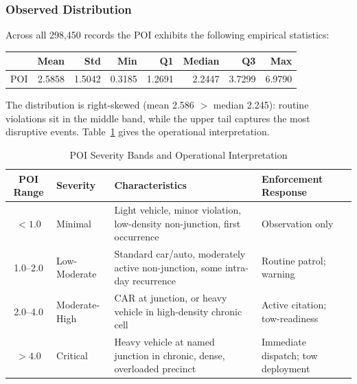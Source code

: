 \documentclass[12pt,a4paper]{article}
\begin{document}
\subsubsection*{Observed Distribution}

Across all 298,450 records the POI exhibits the following empirical statistics:

\begin{center}
\small
\begin{tabular}{@{}lrrrrrrr@{}}
\toprule
 & \textbf{Mean} & \textbf{Std} & \textbf{Min} & \textbf{Q1} & \textbf{Median} & \textbf{Q3} & \textbf{Max}\\
\midrule
POI & 2.5858 & 1.5042 & 0.3185 & 1.2691 & 2.2447 & 3.7299 & 6.9790\\
\bottomrule
\end{tabular}
\end{center}

The distribution is right-skewed (mean 2.586 $>$ median 2.245): routine violations sit in the middle band, while the upper tail captures the most disruptive events. Table~\ref{tab:poi_bands} gives the operational interpretation.

\begin{table}[htbp]
\centering
\caption{POI Severity Bands and Operational Interpretation}
\label{tab:poi_bands}
\small
\begin{tabularx}{\textwidth}{@{}clp{5.2cm}X@{}}
\toprule
\textbf{POI Range} & \textbf{Severity} & \textbf{Characteristics} & \textbf{Enforcement Response}\\
\midrule
$<1.0$   & Minimal       & Light vehicle, minor violation, low-density non-junction, first occurrence & Observation only\\
1.0--2.0 & Low-Moderate  & Standard car/auto, moderately active non-junction, some intra-day recurrence & Routine patrol; warning\\
2.0--4.0 & Moderate-High & CAR at junction, or heavy vehicle in high-density chronic cell & Active citation; tow-readiness\\
$>4.0$   & Critical      & Heavy vehicle at named junction in chronic, dense, overloaded precinct & Immediate dispatch; tow deployment\\
\bottomrule
\end{tabularx}
\end{table}

\end{document}
